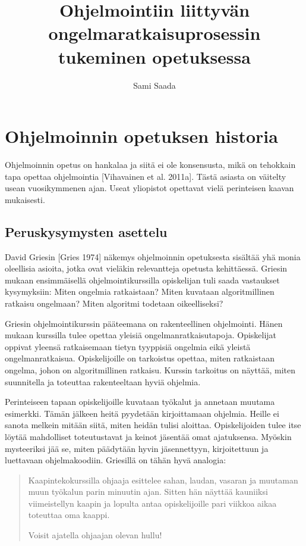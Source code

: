 \documentclass[a4paper]{article}
\author{Sami Saada}
\title{Ohjelmointiin liittyvän ongelmaratkaisuprosessin tukeminen opetuksessa}
\begin{document}
\maketitle \thispagestyle{empty}

\newpage

\setcounter{page}{1}

\section{Ohjelmoinnin opetuksen historia}

Ohjelmoinnin opetus on hankalaa ja siitä ei ole konsensusta, mikä on tehokkain tapa opettaa ohjelmointia [Vihavainen et al. 2011a]. Tästä asiasta on väitelty usean vuosikymmenen ajan. Useat yliopistot opettavat vielä perinteisen kaavan mukaisesti.

\subsection{Peruskysymysten asettelu}

David Griesin [Gries 1974] näkemys ohjelmoinnin opetuksesta sisältää yhä monia oleellisia asioita, jotka ovat vieläkin relevantteja opetusta kehittäessä. Griesin mukaan ensimmäisellä ohjelmointikurssilla opiskelijan tuli saada vastaukset kysymyksiin: Miten ongelmia ratkaistaan? Miten kuvataan algoritmillinen ratkaisu ongelmaan? Miten algoritmi todetaan oikeelliseksi?

Griesin ohjelmointikurssin pääteemana on rakenteellinen ohjelmointi. Hänen mukaan kurssilla tulee opettaa yleisiä ongelmanratkaisutapoja. Opiskelijat oppivat yleensä ratkaisemaan tietyn tyyppisiä ongelmia eikä yleistä ongelmanratkaisua. Opiskelijoille on tarkoistus opettaa, miten ratkaistaan ongelma, johon on algoritmillinen ratkaisu. Kurssin tarkoitus on näyttää, miten suunnitella ja toteuttaa rakenteeltaan hyviä ohjelmia.

Perinteiseen tapaan opiskelijoille kuvataan työkalut ja annetaan muutama esimerkki. Tämän jälkeen heitä pyydetään kirjoittamaan ohjelmia. Heille ei sanota melkein mitään siitä, miten heidän tulisi aloittaa. Opiskelijoiden tulee itse löytää mahdolliset toteutustavat ja keinot jäsentää omat ajatuksensa. Myöskin mysteeriksi jää se, miten päädytään hyvin jäsennettyyn, kirjoitettuun ja luettavaan ohjelmakoodiin. Griesillä on tähän hyvä analogia:

\begin{quotation}
Kaapintekokurssilla ohjaaja esittelee sahan, laudan, vasaran ja muutaman muun työkalun parin minuutin ajan. Sitten hän näyttää kauniiksi viimeistellyn kaapin ja lopulta antaa opiskelijoille pari viikkoa aikaa toteuttaa oma kaappi.

Voisit ajatella ohjaajan olevan hullu!
\end{quotation}
\end{document}
